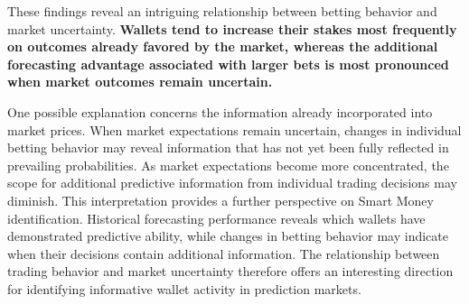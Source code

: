 These findings reveal an intriguing relationship between betting behavior and market uncertainty. \textbf{Wallets tend to increase their stakes most frequently on outcomes already favored by the market, whereas the additional forecasting advantage associated with larger bets is most pronounced when market outcomes remain uncertain.}

One possible explanation concerns the information already incorporated into market prices. When market expectations remain uncertain, changes in individual betting behavior may reveal information that has not yet been fully reflected in prevailing probabilities. As market expectations become more concentrated, the scope for additional predictive information from individual trading decisions may diminish. This interpretation provides a further perspective on Smart Money identification. Historical forecasting performance reveals which wallets have demonstrated predictive ability, while changes in betting behavior may indicate when their decisions contain additional information. The relationship between trading behavior and market uncertainty therefore offers an interesting direction for identifying informative wallet activity in prediction markets.
